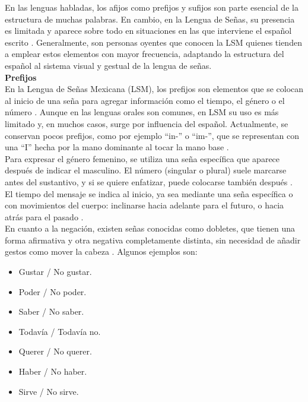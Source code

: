 En las lenguas habladas, los afijos como prefijos y sufijos son parte esencial de la estructura de muchas palabras. En cambio, en la Lengua de Señas, su presencia es limitada y aparece sobre todo en situaciones en las que interviene el español escrito \cite{ref37}. Generalmente, son personas oyentes que conocen la LSM quienes tienden a emplear estos elementos con mayor frecuencia, adaptando la estructura del español al sistema visual y gestual de la lengua de señas.\\

\textbf{Prefijos}\\
En la Lengua de Señas Mexicana (LSM), los prefijos son elementos que se colocan al inicio de una seña para agregar información como el tiempo, el género o el número \cite{ref37}. Aunque en las lenguas orales son comunes, en LSM su uso es más limitado y, en muchos casos, surge por influencia del español. Actualmente, se conservan pocos prefijos, como por ejemplo “in-” o “im-”, que se representan con una “I” hecha por la mano dominante al tocar la mano base \cite{ref37}.\\

Para expresar el género femenino, se utiliza una seña específica que aparece después de indicar el masculino. El número (singular o plural) suele marcarse antes del sustantivo, y si se quiere enfatizar, puede colocarse también después \cite{ref37}.\\

El tiempo del mensaje se indica al inicio, ya sea mediante una seña específica o con movimientos del cuerpo: inclinarse hacia adelante para el futuro, o hacia atrás para el pasado \cite{ref37}.\\

En cuanto a la negación, existen señas conocidas como dobletes, que tienen una forma afirmativa y otra negativa completamente distinta, sin necesidad de añadir gestos como mover la cabeza \cite{ref37}. Algunos ejemplos son:
\begin{itemize}
    \item Gustar / No gustar.
    \item Poder / No poder.
    \item Saber / No saber.
    \item Todavía / Todavía no.
    \item Querer / No querer.
    \item Haber / No haber.
    \item Sirve / No sirve.
\end{itemize}

